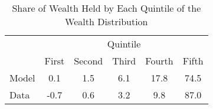 \begin{table}[H] 
\singlespace 
\center 
\caption{Share of Wealth Held by Each Quintile of the Wealth Distribution} \label{tab:wealth_quintile}
\vspace{-.1in} 
\begin{tabular}{l c c c c c}\hline 
\hline 
& \multicolumn{5}{c}{Quintile} \\ 
\cline{2-6}  
  & First & Second & Third & Fourth & Fifth   \\ 
 \hline 
Model &       0.1  &       1.5 &       6.1  &      17.8 &      74.5   \\ Data &      -0.7  &       0.6 &       3.2  &       9.8 &      87.0   \\ \hline 
\end{tabular}
\end{table} 
